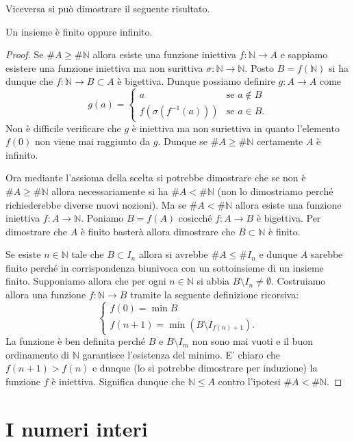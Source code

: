 \documentclass[italian,a4paper,hidelinks,headinclude]{scrartcl}
\newcommand{\NN}{{\mathbb N}}
\begin{document}
Viceversa si può dimostrare il seguente risultato.
\begin{theorem}
  Un insieme è finito oppure infinito.
\end{theorem}
%
\begin{proof}
Se $\# A \ge \#\NN$ allora esiste una funzione iniettiva $f\colon \NN \to A$
e sappiamo esistere una funzione iniettiva ma non surittiva $\sigma\colon \NN \to \NN$.
Posto $B=f(\NN)$ si ha dunque che $f\colon \NN\to B \subset A$ è bigettiva.
Dunque possiamo definire $g \colon A \to A$ come
\[
g(a) =
\begin{cases}
    a & \text{se $a\not \in B$}\\
    f(\sigma(f^{-1}(a))) & \text{se $a \in B$}.
\end{cases}
\]
Non è difficile verificare che $g$ è iniettiva ma non suriettiva in quanto
l'elemento $f(0)$
non viene mai raggiunto da $g$. Dunque se $\# A \ge \#\NN$ certamente $A$
è infinito.

Ora mediante l'assioma della scelta si potrebbe dimostrare che se non è
$\#A \ge \#\NN$ allora necessariamente si ha $\#A < \#\NN$
(non lo dimostriamo perché richiederebbe diverse nuovi nozioni).
Ma se $\#A < \#\NN$ allora esiste una funzione iniettiva $f\colon A \to \NN$.
Poniamo $B=f(A)$ cosicché $f\colon A \to B$ è bigettiva. Per dimostrare
che $A$ è finito basterà allora dimostrare che $B\subset \NN$ è finito.

Se esiste $n\in \NN$ tale che $B\subset I_n$ allora si avrebbe $\#A\le \#I_n$
e dunque $A$ sarebbe finito perché in corrispondenza biunivoca con un sottoinsieme
di un insieme finito. Supponiamo allora che per ogni $n\in \NN$ si abbia
$B\setminus I_n\neq \emptyset$. Costruiamo allora una funzione
$f\colon \NN \to B$ tramite la seguente definizione ricorsiva:
\[
 \begin{cases}
    f(0) = \min B \\
    f(n+1) = \min (B\setminus I_{f(n)+1}).
 \end{cases}
\]
La funzione è ben definita perché $B$ e $B\setminus I_m$ non sono mai vuoti
e il buon ordinamento di $\NN$ garantisce l'esistenza del minimo.
E' chiaro che $f(n+1) > f(n)$ e dunque (lo si potrebbe dimostrare per induzione)
la funzione $f$ è iniettiva. Significa dunque che $\NN\le A$ contro l'ipotesi
$\#A < \#\NN$.

\end{proof}

\section{I numeri interi}
\end{document}
